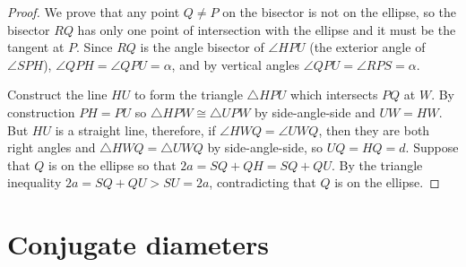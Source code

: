 \begin{proof} 
We prove that any point $Q\neq P$ on the bisector is not on the ellipse, so the bisector $RQ$ has only one point of intersection with the ellipse and it must be the tangent at $P$. Since $RQ$ is the angle bisector of $\angle HPU$ (the exterior angle of $\angle SPH$), $\angle QPH =\angle QPU=\alpha$, and by vertical angles $\angle QPU=\angle RPS=\alpha$.

Construct the line $HU$ to form the triangle $\triangle HPU$ which intersects $PQ$ at $W$. By construction $PH=PU$ so $\triangle HPW\cong \triangle UPW$ by side-angle-side and $UW=HW$. But $HU$ is a straight line, therefore, if $\angle HWQ=\angle UWQ$, then they are both right angles and $\triangle HWQ=\triangle UWQ$ by side-angle-side, so $UQ=HQ=d$. Suppose that $Q$ is on the ellipse so that $2a=SQ+QH=SQ+QU$. By the triangle inequality $2a=SQ+QU>SU=2a$, contradicting that $Q$ is on the ellipse.\hqed
\end{proof}



\section{Conjugate diameters}


